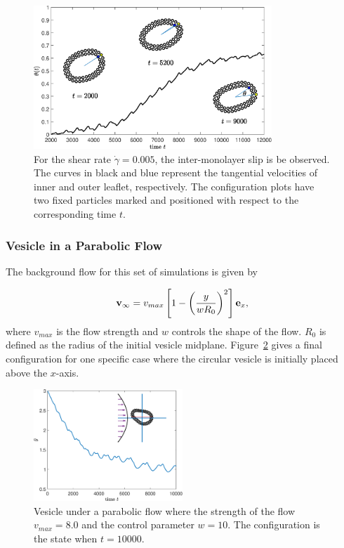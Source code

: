 \documentclass[lineno]{jfm}
\begin{document}
\begin{figure}
\begin{center}
\includegraphics[width=0.8\textwidth]{Slip.eps}
\end{center} 
  \caption{For the shear rate $\dot\gamma=0.005$, the inter-monolayer slip is be observed. The curves in black and blue represent the tangential velocities of inner and outer leaflet, respectively. The configuration plots have two fixed particles marked and positioned with respect to the corresponding time $t$.
  }
    \label{figure5}
\end{figure}




\subsubsection{Vesicle in a Parabolic Flow}

The background flow for this set of simulations is given by

\begin{equation}
{\bf v}_\infty = v_{max}\left[ 1 - \left( \frac{y}{wR_0}\right)^2 \right]{\bf e}_x,
\end{equation}
%
where $v_{max}$ is the flow strength and $w$ controls the shape of the flow. $R_0$ is defined as the radius of the initial vesicle midplane. Figure~\ref{figure6} gives a final configuration for one specific case where the circular vesicle is initially placed above the $x$-axis.

\begin{figure}
\centering
\includegraphics[width=0.5\textwidth]{parabolic.eps}
  \caption{Vesicle under a parabolic flow where the strength of the flow $v_{max}=8.0$ and the control parameter $w=10$. The configuration is the state when $t=10000$.
  }
    \label{figure6}
\end{figure}
\end{document}
